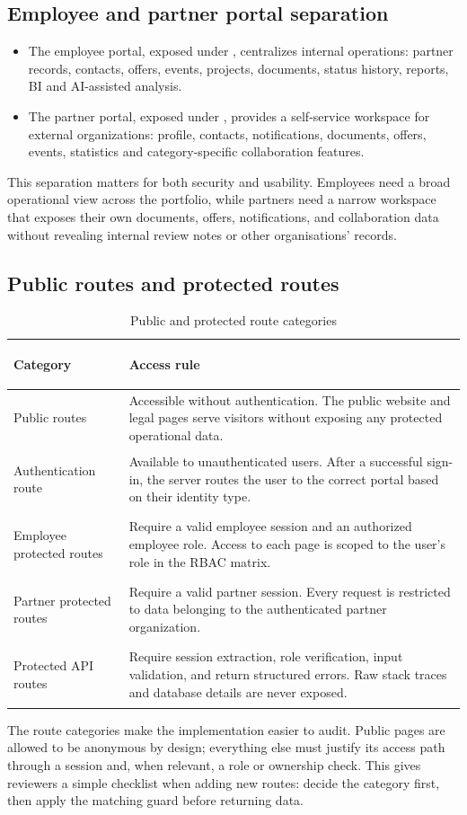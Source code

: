 \subsection{Employee and partner portal separation}
\begin{itemize}
  \item The employee portal, exposed under , centralizes internal operations: partner records, contacts, offers, events, projects, documents, status history, reports, BI and AI-assisted analysis.
  \item The partner portal, exposed under , provides a self-service workspace for external organizations: profile, contacts, notifications, documents, offers, events, statistics and category-specific collaboration features.
\end{itemize}
This separation matters for both security and usability. Employees need a broad operational view across the portfolio, while partners need a narrow workspace that exposes their own documents, offers, notifications, and collaboration data without revealing internal review notes or other organisations' records.
\subsection{Public routes and protected routes}
\begin{table}[H]
  \centering
  \caption{Public and protected route categories}
  \begin{tabularx}{\textwidth}{>{\bfseries\raggedright\arraybackslash}p{3.6cm}
                               >{\raggedright\arraybackslash}X}
    \toprule
    Category & Access rule \\
    \midrule
    Public routes & Accessible without authentication. The public website and legal pages serve visitors without exposing any protected operational data. \\
    Authentication route & Available to unauthenticated users. After a successful sign-in, the server routes the user to the correct portal based on their identity type. \\
    Employee protected routes & Require a valid employee session and an authorized employee role. Access to each page is scoped to the user's role in the RBAC matrix. \\
    Partner protected routes & Require a valid partner session. Every request is restricted to data belonging to the authenticated partner organization. \\
    Protected API routes & Require session extraction, role verification, input validation, and return structured errors. Raw stack traces and database details are never exposed. \\
    \bottomrule
  \end{tabularx}
\end{table}
The route categories make the implementation easier to audit. Public pages are allowed to be anonymous by design; everything else must justify its access path through a session and, when relevant, a role or ownership check. This gives reviewers a simple checklist when adding new routes: decide the category first, then apply the matching guard before returning data.

